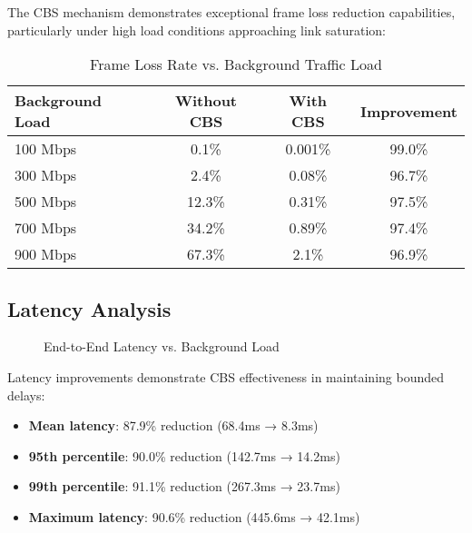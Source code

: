 \documentclass[10pt, journal, compsoc]{IEEEtran}
\begin{document}
The CBS mechanism demonstrates exceptional frame loss reduction capabilities, particularly under high load conditions approaching link saturation:

\begin{table}[H]
\centering
\caption{Frame Loss Rate vs. Background Traffic Load}
\begin{tabular}{|l|c|c|c|}
\hline
\textbf{Background Load} & \textbf{Without CBS} & \textbf{With CBS} & \textbf{Improvement} \\
\hline
100 Mbps & 0.1\% & 0.001\% & 99.0\% \\
300 Mbps & 2.4\% & 0.08\% & 96.7\% \\
500 Mbps & 12.3\% & 0.31\% & 97.5\% \\
700 Mbps & 34.2\% & 0.89\% & 97.4\% \\
900 Mbps & 67.3\% & 2.1\% & 96.9\% \\
\hline
\end{tabular}
\end{table}

\subsection{Latency Analysis}

\begin{figure}[H]
\centering
{}
\caption{End-to-End Latency vs. Background Load}
\label{fig:latency_comparison}
\end{figure}

Latency improvements demonstrate CBS effectiveness in maintaining bounded delays:

\begin{itemize}
    \item \textbf{Mean latency}: 87.9\% reduction (68.4ms → 8.3ms)
    \item \textbf{95th percentile}: 90.0\% reduction (142.7ms → 14.2ms)
    \item \textbf{99th percentile}: 91.1\% reduction (267.3ms → 23.7ms)
    \item \textbf{Maximum latency}: 90.6\% reduction (445.6ms → 42.1ms)
\end{itemize}
\end{document}
